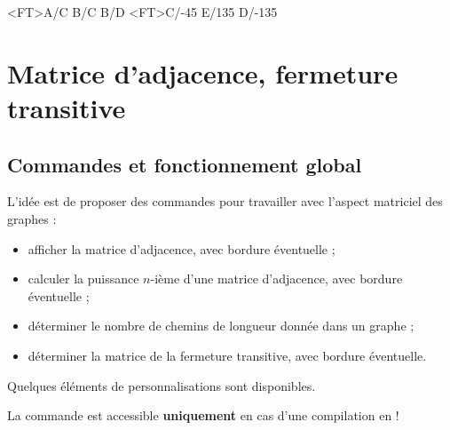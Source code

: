 \documentclass[french,a4paper,11pt]{article}
\begin{document}
{{\begin{DemoCode}[]
\begin{GrapheTikz}
	[DimensionSommets=14pt,Police=\bfseries\sffamily,CouleurSommets={blue/orange}]
\end{GrapheTikz}
\end{DemoCode}

\begin{DemoCode}[]
\begin{GrapheTikz}
	\GrphTraceAretes[AngleGauche]<FT>{A/C B/C B/D}
	\GrphTraceAretes[Boucle]<FT>{C/-45 E/135 D/-135}
\end{GrapheTikz}
\end{DemoCode}

\pagebreak

\section{Matrice d'adjacence, fermeture transitive}

\subsection{Commandes et fonctionnement global}

\begin{tipblock}
L'idée est de proposer des commandes pour travailler avec l'aspect matriciel des graphes :

\begin{itemize}
	\item afficher la matrice d'adjacence, avec bordure éventuelle ;
	\item calculer la puissance $n$-ième d'une matrice d'adjacence, avec bordure éventuelle ;
	\item déterminer le nombre de chemins de longueur donnée dans un graphe ;
	\item déterminer la matrice de la fermeture transitive, avec bordure éventuelle.
\end{itemize}

Quelques éléments de personnalisations sont disponibles.
\end{tipblock}

\begin{warningblock}
La commande est accessible \textbf{uniquement} en cas d'une compilation en  !


\end{warningblock}}}
\end{document}
